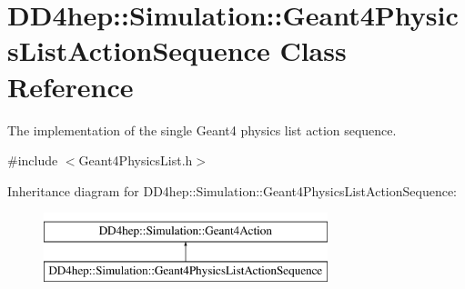 \hypertarget{class_d_d4hep_1_1_simulation_1_1_geant4_physics_list_action_sequence}{}\section{D\+D4hep\+:\+:Simulation\+:\+:Geant4\+Physics\+List\+Action\+Sequence Class Reference}
\label{class_d_d4hep_1_1_simulation_1_1_geant4_physics_list_action_sequence}


The implementation of the single Geant4 physics list action sequence.  




{\ttfamily \#include $<$Geant4\+Physics\+List.\+h$>$}

Inheritance diagram for D\+D4hep\+:\+:Simulation\+:\+:Geant4\+Physics\+List\+Action\+Sequence\+:\begin{figure}[H]
\begin{center}
\leavevmode
\includegraphics[height=2.000000cm]{class_d_d4hep_1_1_simulation_1_1_geant4_physics_list_action_sequence}
\end{center}
\end{figure}
